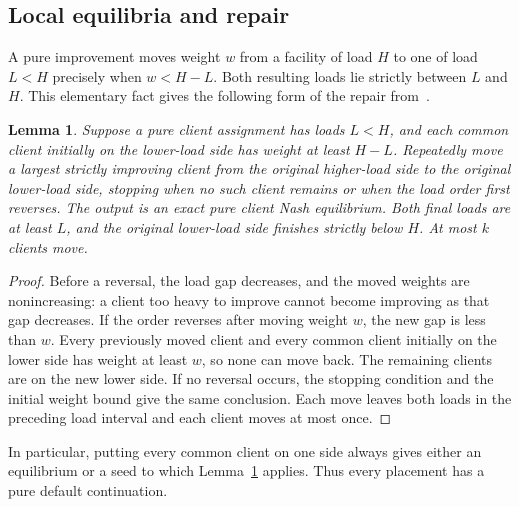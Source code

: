 \documentclass[11pt]{amsart}
\numberwithin{equation}{section}
\newtheorem{lemma}[theorem]{Lemma}
\theoremstyle{definition}
\begin{document}
\subsection{Local equilibria and repair}\label{pure-repair}
A pure improvement moves weight $w$ from a facility of load $H$ to one of load $L<H$ precisely when $w<H-L$. Both resulting loads lie strictly between $L$ and $H$. This elementary fact gives the following form of the repair from~\cite[Lemma~29]{vos2023}.
\begin{lemma}\label{lem:repair}
Suppose a pure client assignment has loads $L<H$, and each common client initially on the lower-load side has weight at least $H-L$. Repeatedly move a largest strictly improving client from the original higher-load side to the original lower-load side, stopping when no such client remains or when the load order first reverses. The output is an exact pure client Nash equilibrium. Both final loads are at least $L$, and the original lower-load side finishes strictly below $H$. At most $k$ clients move.
\end{lemma}
\begin{proof}
Before a reversal, the load gap decreases, and the moved weights are nonincreasing: a client too heavy to improve cannot become improving as that gap decreases. If the order reverses after moving weight $w$, the new gap is less than $w$. Every previously moved client and every common client initially on the lower side has weight at least $w$, so none can move back. The remaining clients are on the new lower side. If no reversal occurs, the stopping condition and the initial weight bound give the same conclusion. Each move leaves both loads in the preceding load interval and each client moves at most once.
\end{proof}
In particular, putting every common client on one side always gives either an equilibrium or a seed to which Lemma~\ref{lem:repair} applies. Thus every placement has a pure default continuation.
\end{document}
